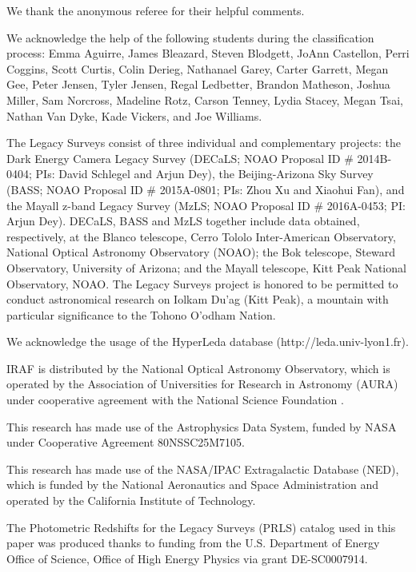 \documentclass{aa}
\begin{document}
\begin{acknowledgements}

We thank the anonymous referee for their helpful comments.

We acknowledge the help of the following students during the classification process: 
Emma Aguirre,
James Bleazard,
Steven Blodgett,
JoAnn Castellon,
Perri Coggins,
Scott Curtis,
Colin Derieg,
Nathanael Garey,
Carter Garrett,
Megan Gee,
Peter Jensen,
Tyler Jensen,
Regal Ledbetter,
Brandon Matheson,
Joshua Miller,
Sam Norcross,
Madeline Rotz,
Carson Tenney,
Lydia Stacey,
Megan Tsai,
Nathan Van Dyke,
Kade Vickers, and
Joe Williams.

The Legacy Surveys consist of three individual and complementary projects: the Dark Energy Camera Legacy Survey (DECaLS; NOAO Proposal ID \# 2014B-0404; PIs: David Schlegel and Arjun Dey), the Beijing-Arizona Sky Survey (BASS; NOAO Proposal ID \# 2015A-0801; PIs: Zhou Xu and Xiaohui Fan), and the Mayall z-band Legacy Survey (MzLS; NOAO Proposal ID \# 2016A-0453; PI: Arjun Dey). DECaLS, BASS and MzLS together include data obtained, respectively, at the Blanco telescope, Cerro Tololo Inter-American Observatory, National Optical Astronomy Observatory (NOAO); the Bok telescope, Steward Observatory, University of Arizona; and the Mayall telescope, Kitt Peak National Observatory, NOAO. The Legacy Surveys project is honored to be permitted to conduct astronomical research on Iolkam Du’ag (Kitt Peak), a mountain with particular significance to the Tohono O’odham Nation.

We acknowledge the usage of the HyperLeda database (http://leda.univ-lyon1.fr).

IRAF is distributed by the National Optical Astronomy Observatory, which is operated by the Association of Universities for Research in Astronomy (AURA) under cooperative agreement with the National Science Foundation \citep{1993ASPC...52..173T}.

This research has made use of the Astrophysics Data System, funded by NASA under Cooperative Agreement 80NSSC25M7105.

This research has made use of the NASA/IPAC Extragalactic Database (NED), which is funded by the National Aeronautics and Space Administration and operated by the California Institute of Technology.

The Photometric Redshifts for the Legacy Surveys (PRLS) catalog used in this paper was produced thanks to funding from the U.S. Department of Energy Office of Science, Office of High Energy Physics via grant DE-SC0007914.


\end{acknowledgements}
\end{document}
